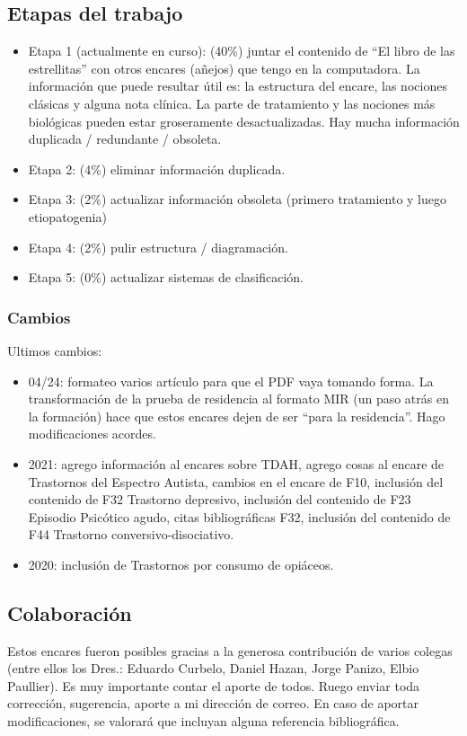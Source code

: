 \documentclass{scrbook}
\begin{document}
\subsection*{Etapas del trabajo}
\begin{itemize}
\item Etapa 1 (actualmente en curso): \faBatteryHalf (40\%) juntar el contenido de ``El libro de las estrellitas'' con otros encares (añejos) que tengo en la computadora. La información que puede resultar útil es: la estructura del encare, las nociones clásicas y alguna nota clínica. La parte de tratamiento y las nociones más biológicas pueden estar groseramente desactualizadas. Hay mucha información duplicada / redundante / obsoleta.
\item Etapa 2: \faBatteryEmpty (4\%) eliminar información duplicada.
\item Etapa 3: \faBatteryEmpty (2\%) actualizar información obsoleta (primero tratamiento y luego etiopatogenia)
\item Etapa 4: \faBatteryEmpty (2\%) pulir estructura / diagramación.
\item Etapa 5: \faBatteryEmpty (0\%) actualizar sistemas de clasificación.
\end{itemize}
\subsubsection*{Cambios}
Ultimos cambios:
\begin{itemize}
	\item 04/24: formateo varios artículo para que el PDF vaya tomando forma. La transformación de la prueba de residencia al formato MIR (un paso atrás en la formación) hace que estos encares dejen de ser ``para la residencia''. Hago modificaciones acordes.
	\item 2021: agrego información al encares sobre TDAH, agrego cosas al encare de Trastornos del Espectro Autista, cambios en el encare de F10, inclusión del contenido de F32 Trastorno depresivo, inclusión del contenido de F23 Episodio Psicótico agudo, citas bibliográficas F32, inclusión del contenido de F44 Trastorno conversivo-disociativo.
	\item 2020: inclusión de Trastornos por consumo de opiáceos.
\end{itemize}
\subsection*{Colaboración}
Estos encares fueron posibles gracias a la generosa contribución de varios colegas (entre ellos los Dres.: Eduardo Curbelo, Daniel Hazan, Jorge Panizo, Elbio Paullier). Es muy importante contar el aporte de todos. Ruego enviar toda corrección, sugerencia, aporte a mi dirección de correo. En caso de aportar modificaciones, se valorará que incluyan alguna referencia bibliográfica.
\end{document}
